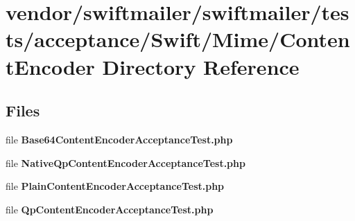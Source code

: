 \section{vendor/swiftmailer/swiftmailer/tests/acceptance/\+Swift/\+Mime/\+Content\+Encoder Directory Reference}
\label{dir_c0b3572b4818741f33bf043973769257}
\subsection*{Files}
\begin{DoxyCompactItemize}
\item 
file {\bf Base64\+Content\+Encoder\+Acceptance\+Test.\+php}
\item 
file {\bf Native\+Qp\+Content\+Encoder\+Acceptance\+Test.\+php}
\item 
file {\bf Plain\+Content\+Encoder\+Acceptance\+Test.\+php}
\item 
file {\bf Qp\+Content\+Encoder\+Acceptance\+Test.\+php}
\end{DoxyCompactItemize}
